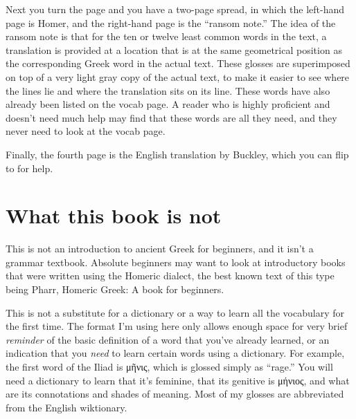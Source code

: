 {Next you turn the page and you have a two-page spread, in which the
left-hand page is Homer, and the right-hand page is the ``ransom note.''
The idea of the ransom note is that for the ten or twelve least common
words in the text, a translation is provided at a location that is at
the same geometrical position as the corresponding Greek word in the
actual text. These glosses are superimposed on top of a very light
gray copy of the actual text, to make it easier to see where the lines
lie and where the translation sits on its line. These words have also
already been listed on the vocab page. A reader who is highly
proficient and doesn't need much help may find that these words are
all they need, and they never need to look at the vocab page.

Finally, the fourth page is the English translation by Buckley, which you can flip to for help.

\section*{What this book is not}

This is not an introduction to ancient Greek for beginners, and it isn't a grammar textbook.
Absolute beginners may want to look at introductory books that were written using the Homeric
dialect, the best known text of this type being Pharr, Homeric Greek: A book for beginners.

This is not a substitute for a dictionary or a way to learn all the vocabulary for the first
time. The format I'm using here only allows enough space
for very brief \emph{reminder} of the basic definition of a word that you've already learned,
or an indication that you \emph{need} to learn certain words using a dictionary. For example,
the first word of the Iliad is μῆνις, which is glossed simply as ``rage.'' You will need a
dictionary to learn that it's feminine, that its genitive is μήνιος, and what are its connotations
and shades of meaning. Most of my glosses are abbreviated from the English wiktionary.

}
